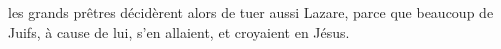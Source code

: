 \encetemps les grands prêtres décidèrent alors de tuer aussi Lazare,
	parce que beaucoup de Juifs, à cause de lui, s’en allaient,
	et croyaient en Jésus.
